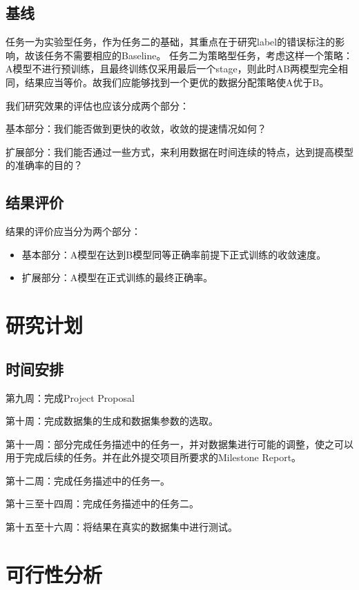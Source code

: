 \documentclass{article}
\begin{document}
\subsection{基线}

任务一为实验型任务，作为任务二的基础，其重点在于研究label的错误标注的影响，故该任务不需要相应的Baseline。
任务二为策略型任务，考虑这样一个策略：A模型不进行预训练，且最终训练仅采用最后一个stage，则此时AB两模型完全相同，结果应当等价。故我们应能够找到一个更优的数据分配策略使A优于B。

我们研究效果的评估也应该分成两个部分：

基本部分：我们能否做到更快的收敛，收敛的提速情况如何？

扩展部分：我们能否通过一些方式，来利用数据在时间连续的特点，达到提高模型的准确率的目的？

\subsection{结果评价}
结果的评价应当分为两个部分：
\begin{itemize}
    \item 基本部分：A模型在达到B模型同等正确率前提下正式训练的收敛速度。
    \item 扩展部分：A模型在正式训练的最终正确率。
\end{itemize}

\section{研究计划}

\subsection{时间安排}

第九周：完成Project Proposal

第十周：完成数据集的生成和数据集参数的选取。

第十一周：部分完成任务描述中的任务一，并对数据集进行可能的调整，使之可以用于完成后续的任务。并在此外提交项目所要求的Milestone Report。

第十二周：完成任务描述中的任务一。

第十三至十四周：完成任务描述中的任务二。

第十五至十六周：将结果在真实的数据集中进行测试。

\section{可行性分析}
\end{document}
